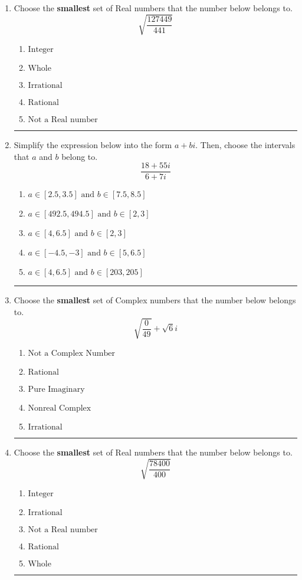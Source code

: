 \documentclass[14pt]{extbook}
\newcommand{\litem}[1]{\item#1\hspace*{-1cm}\rule{\textwidth}{0.4pt}}
\begin{document}
\begin{enumerate}
{\begin{enumerate}[label=\Alph*.]
\end{enumerate} }
\litem{
Choose the \textbf{smallest} set of Real numbers that the number below belongs to.\[ \sqrt{\frac{127449}{441}} \]\begin{enumerate}[label=\Alph*.]
\item \( \text{Integer} \)
\item \( \text{Whole} \)
\item \( \text{Irrational} \)
\item \( \text{Rational} \)
\item \( \text{Not a Real number} \)

\end{enumerate} }
\litem{
Simplify the expression below into the form $a+bi$. Then, choose the intervals that $a$ and $b$ belong to.\[ \frac{18 + 55 i}{6 + 7 i} \]\begin{enumerate}[label=\Alph*.]
\item \( a \in [2.5, 3.5] \text{ and } b \in [7.5, 8.5] \)
\item \( a \in [492.5, 494.5] \text{ and } b \in [2, 3] \)
\item \( a \in [4, 6.5] \text{ and } b \in [2, 3] \)
\item \( a \in [-4.5, -3] \text{ and } b \in [5, 6.5] \)
\item \( a \in [4, 6.5] \text{ and } b \in [203, 205] \)

\end{enumerate} }
\litem{
Choose the \textbf{smallest} set of Complex numbers that the number below belongs to.\[ \sqrt{\frac{0}{49}}+\sqrt{6}i \]\begin{enumerate}[label=\Alph*.]
\item \( \text{Not a Complex Number} \)
\item \( \text{Rational} \)
\item \( \text{Pure Imaginary} \)
\item \( \text{Nonreal Complex} \)
\item \( \text{Irrational} \)

\end{enumerate} }
\litem{
Choose the \textbf{smallest} set of Real numbers that the number below belongs to.\[ \sqrt{\frac{78400}{400}} \]\begin{enumerate}[label=\Alph*.]
\item \( \text{Integer} \)
\item \( \text{Irrational} \)
\item \( \text{Not a Real number} \)
\item \( \text{Rational} \)
\item \( \text{Whole} \)


\end{enumerate}}
\end{enumerate}
\end{document}
